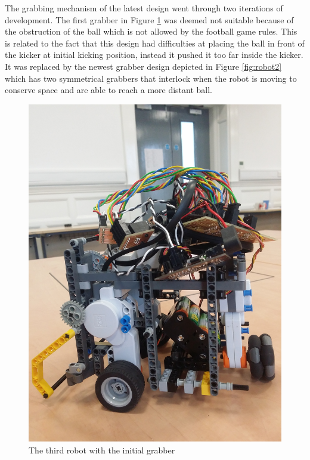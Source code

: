 \documentclass[12pt]{article}
\begin{document}
The grabbing mechanism of the latest design went through two iterations of
development.
The first grabber in Figure \ref{fig:robot1} was deemed not suitable because of
the obstruction of the ball which is not allowed by the football game rules.
This is related to the fact that this design had difficulties at placing the
ball in front of the kicker at initial kicking position, instead it pushed it
too far inside the kicker. It was replaced by the newest grabber design
depicted in Figure \ref{fig:robot2} which has two symmetrical grabbers that
interlock when the robot is moving to conserve space and are able to reach a
more distant ball.

\begin{figure}
	\centering
	\begin{minipage}[b]{.48\textwidth}
        \centering
		\includegraphics[scale=.065,angle=-90]{robot1.jpg}
		\caption{The third robot with the initial grabber}
		\label{fig:robot1}
	\end{minipage}

\end{figure}
\end{document}
